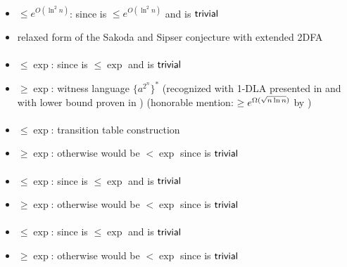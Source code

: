 \paragraph{\TNFA{}\tto\ODLA}
\begin{itemize}
	\item $\le e^{O(\ln^2n)}$: since \hyperref[cost:2NFAto2DFAu]{\TNFA{}\tto\TDFA} is $\le e^{O(\ln^2n)}$ and \TDFA{}\tto\ODLA is $\mathsf{trivial}$
	\item relaxed form of the Sakoda and Sipser conjecture with extended 2DFA
\end{itemize}
\paragraph{\ODLA{}\tto\TNFA}\label{cost:1DLAto2NFAu}
\begin{itemize}
	\item $\le\exp$: since \hyperref[cost:1DLAto1DFAu]{\ODLA{}\tto\ODFA} is $\le\exp$ and \ODFA{}\tto\TNFA is $\mathsf{trivial}$
	\item $\ge\exp$: witness language $\{a^{2^n}\}^*$ (recognized with 1-DLA presented in \cite{PigPri19} and with \TNFA lower bound proven in \cite{MerPig00}) (honorable mention: $\ge e^{\Omega(\sqrt{n\ln n})}$ by \cite{KutPig+18})
\end{itemize}
\paragraph{\ODLA{}\tto\ODFA}\label{cost:1DLAto1DFAu}
\begin{itemize}
	\item $\le\exp$: transition table construction \cite{PigPis14}
	\item $\ge\exp$: otherwise \hyperref[cost:1DLAto2NFAu]{\ODLA{}\tto\TNFA} would be $<\exp$ since \ODFA{}\tto\TNFA is $\mathsf{trivial}$
\end{itemize}
\paragraph{\ODLA{}\tto\ONFA}\label{cost:1LAto1NFAu}
\begin{itemize}
	\item $\le\exp$: since \hyperref[cost:1DLAto1DFAu]{\ODLA{}\tto\ODFA} is $\le\exp$ and \ODFA{}\tto\ONFA is $\mathsf{trivial}$
	\item $\ge\exp$: otherwise \hyperref[cost:1DLAto2NFAu]{\ODLA{}\tto\TNFA} would be $<\exp$ since \ONFA{}\tto\TNFA is $\mathsf{trivial}$
\end{itemize}
\paragraph{\ODLA{}\tto\TDFA}\label{cost:1DLAto2DFAu}
\begin{itemize}
	\item $\le\exp$: since \hyperref[cost:1DLAto1DFAu]{\ODLA{}\tto\ODFA} is $\le\exp$ and \ODFA{}\tto\TDFA is $\mathsf{trivial}$
	\item $\ge\exp$: otherwise \hyperref[cost:1DLAto2NFAu]{\ODLA{}\tto\TNFA} would be $<\exp$ since \TDFA{}\tto\TNFA is $\mathsf{trivial}$
\end{itemize}
